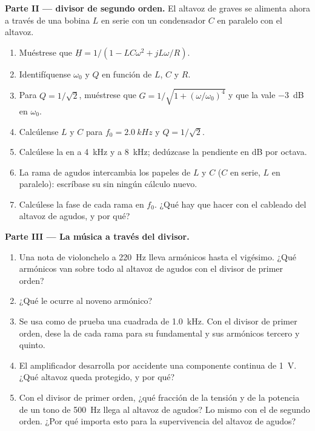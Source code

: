 \begin{problem}
\medskip
\noindent\textbf{Parte II ---  divisor de segundo orden.}
El altavoz de graves se alimenta ahora a través de una bobina $L$ en serie
con un condensador $C$ en paralelo con el altavoz.
\begin{enumerate}[resume]
  \item Muéstrese que $\underline H = 1/(1 - LC\omega^2 + jL\omega/R)$.
  \item Identifíquense $\omega_0$ y $Q$ en función de $L$, $C$ y $R$.
  \item Para $Q = 1/\sqrt2$, muéstrese que $G = 1/\sqrt{1 + (\omega/\omega_0)^4}$
        y que la  vale \qty{-3}{dB} en $\omega_0$.
  \item Calcúlense $L$ y $C$ para $f_0 = \qty{2.0}{kHz}$ y $Q = 1/\sqrt2$.
  \item Calcúlese la  en  a \qty{4}{kHz} y a
        \qty{8}{kHz}; dedúzcase la pendiente en dB por octava.
  \item La rama de agudos intercambia los papeles de $L$ y $C$ ($C$ en
        serie, $L$ en paralelo): escríbase su  sin
        ningún cálculo nuevo.
  \item Calcúlese la fase de cada rama en $f_0$. ¿Qué hay que hacer con el
        cableado del altavoz de agudos, y por qué?
\end{enumerate}

\medskip
\noindent\textbf{Parte III --- La música a través del  divisor.}
\begin{enumerate}[resume]
  \item Una nota de violonchelo a \qty{220}{Hz} lleva armónicos hasta el
        vigésimo. ¿Qué armónicos van sobre todo al altavoz de agudos con
        el  divisor de primer orden?
  \item ¿Qué le ocurre al noveno armónico?
  \item Se usa como  de prueba una  cuadrada de \qty{1.0}{kHz}.
        Con el  divisor de primer orden, dese la  de cada
        rama para su fundamental y sus armónicos tercero y quinto.
  \item El amplificador desarrolla por accidente una componente continua
        de \qty{1}{V}. ¿Qué altavoz queda protegido, y por qué?
  \item Con el  divisor de primer orden, ¿qué fracción de la tensión
        y de la potencia de un tono de \qty{500}{Hz} llega al altavoz de
        agudos? Lo mismo con el de segundo orden. ¿Por qué importa esto
        para la supervivencia del altavoz de agudos?
\end{enumerate}


\end{problem}
